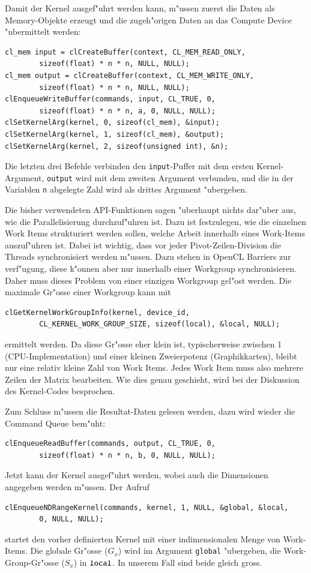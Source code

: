 Damit der Kernel ausgef"uhrt werden kann, m"ussen zuerst die Daten
als Memory-Objekte erzeugt und die zugeh"origen Daten an das Compute Device
"ubermittelt werden:
\begin{verbatim}
cl_mem input = clCreateBuffer(context, CL_MEM_READ_ONLY,
        sizeof(float) * n * n, NULL, NULL);
cl_mem output = clCreateBuffer(context, CL_MEM_WRITE_ONLY,
        sizeof(float) * n * n, NULL, NULL);
clEnqueueWriteBuffer(commands, input, CL_TRUE, 0,
        sizeof(float) * n * n, a, 0, NULL, NULL);
clSetKernelArg(kernel, 0, sizeof(cl_mem), &input);
clSetKernelArg(kernel, 1, sizeof(cl_mem), &output);
clSetKernelArg(kernel, 2, sizeof(unsigned int), &n);
\end{verbatim}
Die letzten drei Befehle verbinden den \verb+input+-Puffer mit dem ersten
Kernel-Argument, \verb+output+ wird mit dem zweiten
Argument verbunden, und die in der Variablen \verb+n+ abgelegte
Zahl wird als drittes Argument "ubergeben.

Die bisher verwendeten API-Funktionen sagen "uberhaupt nichts dar"uber
aus, wie die Parallelisierung durchzuf"uhren ist. Dazu ist festzulegen,
wie die einzelnen Work Items strukturiert werden sollen, welche Arbeit
innerhalb eines Work-Items auszuf"uhren ist.
Dabei ist wichtig, dass vor jeder Pivot-Zeilen-Division die Threads
synchronisiert werden m"ussen. Dazu stehen in OpenCL Barriers
zur verf"ugung, diese k"onnen aber nur innerhalb einer Workgroup
synchronisieren. Daher muss dieses Problem von einer einzigen Workgroup
gel"ost werden. Die maximale Gr"osse einer Workgroup kann mit
\begin{verbatim}
clGetKernelWorkGroupInfo(kernel, device_id,
        CL_KERNEL_WORK_GROUP_SIZE, sizeof(local), &local, NULL);
\end{verbatim}
ermittelt werden.
Da diese Gr"osse eher klein ist, typischerweise
zwischen 1 (CPU-Implementation) und einer kleinen Zweierpotenz
(Graphikkarten), bleibt nur eine relativ kleine Zahl von Work Items.
Jedes Work Item muss also mehrere Zeilen der Matrix bearbeiten.
Wie dies genau geschieht, wird bei der Diskussion des Kernel-Codes
besprochen.

Zum Schluss m"ussen die Resultat-Daten gelesen werden, dazu wird wieder
die Command Queue bem"uht:
\begin{verbatim}
clEnqueueReadBuffer(commands, output, CL_TRUE, 0,
        sizeof(float) * n * n, b, 0, NULL, NULL);
\end{verbatim}

Jetzt kann der Kernel ausgef"uhrt werden, wobei auch die Dimensionen
angegeben werden m"ussen. Der Aufruf
\begin{verbatim}
clEnqueueNDRangeKernel(commands, kernel, 1, NULL, &global, &local,
        0, NULL, NULL);
\end{verbatim}
startet den vorher definierten Kernel mit einer indimensionalen
Menge von Work-Items. Die globale Gr"osse ($G_x$) wird im
Argument \verb+global+ "ubergeben, die Work-Group-Gr"osse ($S_x$)
in $\verb+local+$. In unserem Fall sind beide gleich gross.

